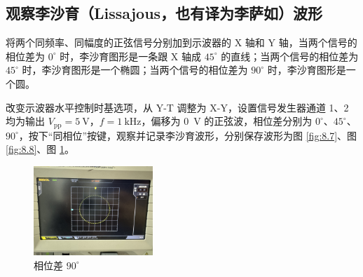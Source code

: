 \documentclass[a4paper,utf8]{article}
\begin{document}
\subsection{观察李沙育（Lissajous，也有译为李萨如）波形}
将两个同频率、同幅度的正弦信号分别加到示波器的 X 轴和 Y 轴，当两个信号的相位差为 $0^\circ$ 时，李沙育图形是一条跟 X 轴成 $45^\circ$ 的直线；当两个信号的相位差为 $45^\circ$ 时，李沙育图形是一个椭圆；当两个信号的相位差为 $90^\circ$ 时，李沙育图形是一个圆。\par
改变示波器水平控制时基选项，从 Y-T 调整为 X-Y，设置信号发生器通道 1、2 均为输出 $V_\text{pp}=\SI{5}{\V}$，$f=\SI{1}{\kilo\Hz}$，偏移为 \SI{0}{\V} 的正弦波，相位差分别为 $0^\circ$、$45^\circ$、$90^\circ$，按下“同相位”按键，观察并记录李沙育波形，分别保存波形为图 \ref{fig:8.7}、图 \ref{fig:8.8}、图 \ref{fig:8.9}。
\begin{figure}[!ht]
    \begin{floatrow}[2]
    \end{floatrow}
\end{figure}
\begin{figure}[!ht]
    \includegraphics[width=0.4\textwidth]{8_7.jpg}
    \caption{相位差 $90^\circ$\label{fig:8.9}}
\end{figure}
\end{document}
